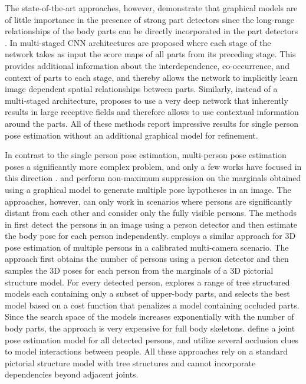 \documentclass[runningheads]{llncs}
\begin{document}
The state-of-the-art approaches, however, demonstrate that graphical models are of little importance in the presence of strong part detectors since the long-range relationships of the body parts can be directly incorporated in the part detectors \cite{pishchulin2015deepcut, carreira2015human, wei2016convolutional, insafutdinov2016deepercut, newell2016eccv, bulat2016human, rafi2016bmvc}. In \cite{wei2016convolutional, newell2016eccv, bulat2016human} multi-staged CNN architectures are proposed where each stage of the network takes as input the score maps of all parts from its preceding stage. This provides additional information about the interdependence, co-occurrence, and context of parts to each stage, and thereby allows the network to implicitly learn image dependent spatial relationships between parts. Similarly, instead of a multi-staged architecture, \cite{insafutdinov2016deepercut} proposes to use a very deep network that inherently results in large receptive fields and therefore allows to use contextual information around the parts. All of these methods report impressive results for single person pose estimation without an additional graphical model for refinement. 

In contrast to the single person pose estimation, multi-person pose estimation poses a significantly more complex problem, and only a few works have focused in this direction \cite{eichner2010we, sun2011articulated, pishchulin2012articulated, yang_tpami2014, ladicky2013human, gkioxari2014using, chen2015parsing, belagiannis2015tpami, pishchulin2015deepcut, insafutdinov2016deepercut}. \cite{yang_tpami2014} and \cite{sun2011articulated} perform non-maximum suppression on the marginals obtained using a graphical model to generate multiple pose hypotheses in an image. The approaches, however, can only work in scenarios where persons are significantly distant from each other and consider only the fully visible persons. The methods in \cite{pishchulin2012articulated, gkioxari2014using, chen2015parsing} first detect the persons in an image using a person detector and then estimate the body pose for each person independently. \cite{sun2011articulated} employs a similar approach for 3D pose estimation of multiple persons in a calibrated multi-camera scenario. The approach first obtains the number of persons using a person detector and then samples the 3D poses for each person from the marginals of a 3D pictorial structure model. For every detected person, \cite{chen2015parsing} explores a range of tree structured models each containing only a subset of upper-body parts, and selects the best model based on a cost function that penalizes a model containing occluded parts. Since the search space of the models increases exponentially with the number of body parts, the approach is very expensive for full body skeletons. \cite{eichner2010we, Ladicky_2013_CVPR} define a joint pose estimation model for all detected persons, and utilize several occlusion clues to model interactions between people. All these approaches rely on a standard pictorial structure model with tree structures and cannot incorporate dependencies beyond adjacent joints.
\end{document}
